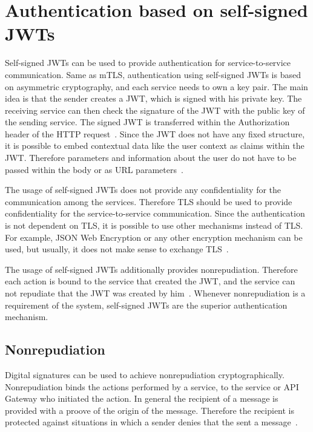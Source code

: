 \section{Authentication based on self-signed JWTs}
Self-signed JWTs can be used to provide authentication for service-to-service communication.
Same as mTLS, authentication using self-signed JWTs is based on asymmetric cryptography, and each service needs to own a key pair.
The main idea is that the sender creates a JWT, which is signed with his private key.
The receiving service can then check the signature of the JWT with the public key of the sending service.
The signed JWT is transferred within the Authorization header of the HTTP request~\cite{dias2020microservices}.
Since the JWT does not have any fixed structure, it is possible to embed contextual data like the user context as claims within the JWT.
Therefore parameters and information about the user do not have to be passed within the body or as URL parameters~\cite{dias2020microservices}.


The usage of self-signed JWTs does not provide any confidentiality for the communication among the services.
Therefore TLS should be used to provide confidentiality for the service-to-service communication.
Since the authentication is not dependent on TLS, it is possible to use other mechanisms instead of TLS.
For example, JSON Web Encryption or any other encryption mechanism can be used, but usually, it does not make sense to exchange TLS~\cite{dias2020microservices}.

The usage of self-signed JWTs additionally provides nonrepudiation.
Therefore each action is bound to the service that created the JWT, and the service can not repudiate that the JWT was created by him~\cite{dias2020microservices}.
Whenever nonrepudiation is a requirement of the system, self-signed JWTs are the superior authentication mechanism.

\subsection{Nonrepudiation}
Digital signatures can be used to achieve nonrepudiation cryptographically.
Nonrepudiation binds the actions performed by a service, to the service or API Gateway who initiated the action.
In general the recipient of a message is provided with a proove of the origin of the message.
Therefore the recipient is protected against situations in which a sender denies that the sent a message~\cite{wu20131200}.

